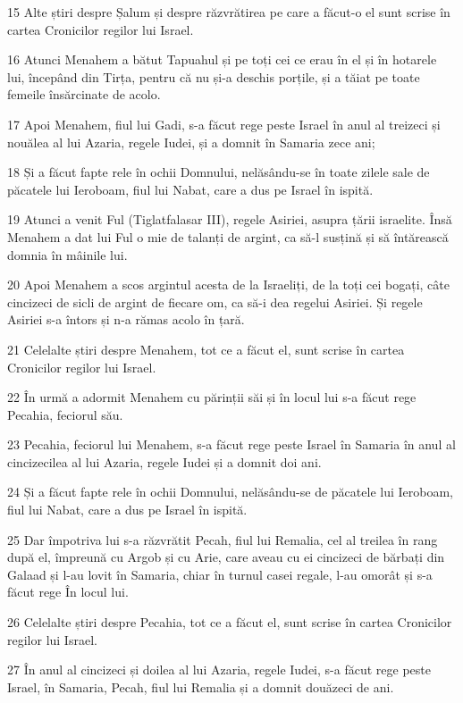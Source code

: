 \par 15 Alte știri despre Șalum și despre răzvrătirea pe care a făcut-o el sunt scrise în cartea Cronicilor regilor lui Israel.
\par 16 Atunci Menahem a bătut Tapuahul și pe toți cei ce erau în el și în hotarele lui, începând din Tirța, pentru că nu și-a deschis porțile, și a tăiat pe toate femeile însărcinate de acolo.
\par 17 Apoi Menahem, fiul lui Gadi, s-a făcut rege peste Israel în anul al treizeci și nouălea al lui Azaria, regele Iudei, și a domnit în Samaria zece ani;
\par 18 Și a făcut fapte rele în ochii Domnului, nelăsându-se în toate zilele sale de păcatele lui Ieroboam, fiul lui Nabat, care a dus pe Israel în ispită.
\par 19 Atunci a venit Ful (Tiglatfalasar III), regele Asiriei, asupra țării israelite. Însă Menahem a dat lui Ful o mie de talanți de argint, ca să-l susțină și să întărească domnia în mâinile lui.
\par 20 Apoi Menahem a scos argintul acesta de la Israeliți, de la toți cei bogați, câte cincizeci de sicli de argint de fiecare om, ca să-i dea regelui Asiriei. Și regele Asiriei s-a întors și n-a rămas acolo în țară.
\par 21 Celelalte știri despre Menahem, tot ce a făcut el, sunt scrise în cartea Cronicilor regilor lui Israel.
\par 22 În urmă a adormit Menahem cu părinții săi și în locul lui s-a făcut rege Pecahia, feciorul său.
\par 23 Pecahia, feciorul lui Menahem, s-a făcut rege peste Israel în Samaria în anul al cincizecilea al lui Azaria, regele Iudei și a domnit doi ani.
\par 24 Și a făcut fapte rele în ochii Domnului, nelăsându-se de păcatele lui Ieroboam, fiul lui Nabat, care a dus pe Israel în ispită.
\par 25 Dar împotriva lui s-a răzvrătit Pecah, fiul lui Remalia, cel al treilea în rang după el, împreună cu Argob și cu Arie, care aveau cu ei cincizeci de bărbați din Galaad și l-au lovit în Samaria, chiar în turnul casei regale, l-au omorât și s-a făcut rege În locul lui.
\par 26 Celelalte știri despre Pecahia, tot ce a făcut el, sunt scrise în cartea Cronicilor regilor lui Israel.
\par 27 În anul al cincizeci și doilea al lui Azaria, regele Iudei, s-a făcut rege peste Israel, în Samaria, Pecah, fiul lui Remalia și a domnit douăzeci de ani.
